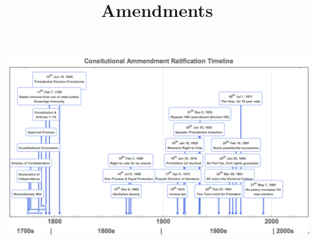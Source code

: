 \documentclass[aspectratio=169]{beamer}
\title{Amendments}
\date{}
\theoremstyle{principle}
\begin{document}


{
  \begin{frame}[plain]
  

  \end{frame}
}

\begin{frame}

\begin{center}
\includegraphics[scale=0.4]{Amendment_timeline.png}
\end{center}


\end{frame}
\end{document}
